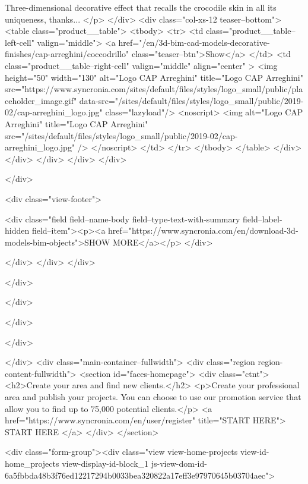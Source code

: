             Three-dimensional decorative effect that recalls the crocodile skin in all its uniqueness, thanks...
	</p>
	</div>
	<div class="col-xs-12 teaser--bottom">
		<table class="product__table">
            <tbody>
            	<tr>
                	<td class="product__table--left-cell" valign="middle"> 
                    	<a href="/en/3d-bim-cad-models-decorative-finishes/cap-arreghini/coccodrillo" class="teaser--btn">Show</a>
                	</td>
               		<td class="product__table--right-cell" valign="middle" align="center" >
                    	<img  height="50" width="130" alt="Logo CAP Arreghini" title="Logo CAP Arreghini" src="https://www.syncronia.com/sites/default/files/styles/logo_small/public/placeholder_image.gif" data-src="/sites/default/files/styles/logo_small/public/2019-02/cap-arreghini_logo.jpg" class="lazyload"/>
            <noscript>
                <img alt="Logo CAP Arreghini" title="Logo CAP Arreghini" src="/sites/default/files/styles/logo_small/public/2019-02/cap-arreghini_logo.jpg" />
            </noscript>
					</td>
           		</tr>
            </tbody>
        </table>
	</div>
</div>
          </div>
      </div>
      </div>

    </div>
  
            <div class="view-footer">
      
            <div class="field field--name-body field--type-text-with-summary field--label-hidden field--item"><p><a href="https://www.syncronia.com/en/download-3d-models-bim-objects">SHOW MORE</a></p>
</div>
      
    </div>
    </div>
</div>

  </div>


  </div>

            
                  </div>

                      </div>

      
    </div>
        <div class="main-container--fullwidth">
      <div class="region region-content-fullwidth">
    <section id="faces-homepage">
	<div class="ctnt">
		<h2>Create your area and find new clients.</h2>
		<p>Create your professional area and publish your projects. You can choose to use our promotion service that allow you to find up to 75,000 potential clients.</p>
					<a href="https://www.syncronia.com/en/user/register" title="START HERE">
				START HERE
			</a>
			</div>
</section>



<div class="form-group"><div class="view view-home-projects view-id-home_projects view-display-id-block_1 js-view-dom-id-6a5fbbda48b3f76ed12217294b0033bea320822a17eff3e97970645b03704aec">
  
